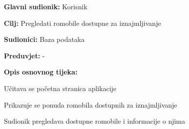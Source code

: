 					
					\noindent {}
					\begin{packed_item}
	
						\item \textbf{Glavni sudionik: }Korisnik
						\item  \textbf{Cilj:} Pregledati romobile dostupne za iznajmljivanje
						\item  \textbf{Sudionici:} Baza podataka
						\item  \textbf{Preduvjet:} -
						\item  \textbf{Opis osnovnog tijeka:}
						
						\item[] \begin{packed_enum}
	
							\item Učitava se početna stranica aplikacije
							\item Prikazuje se ponuda romobila dostupnih za iznajmljivanje
							\item Sudionik pregledava dostupne romobile i informacije o njima
						
						\end{packed_enum}
					\end{packed_item}
						
